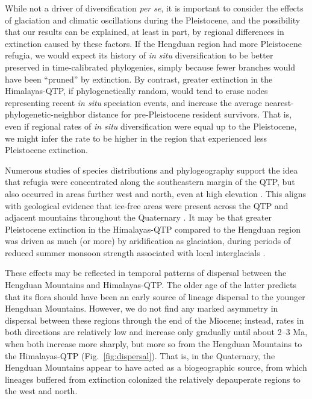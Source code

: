 
While not a driver of diversification \textit{per se}, it is important to consider the effects of glaciation and climatic oscillations during the Pleistocene, and the possibility that our results can be explained, at least in part, by regional differences in extinction caused by these factors. If the Hengduan region had more Pleistocene refugia, we would expect its history of \textit{in situ} diversification to be better preserved in time-calibrated phylogenies, simply because fewer branches would have been ``pruned'' by extinction. By contrast, greater extinction in the Himalayas-QTP, if phylogenetically random, would tend to erase nodes representing recent \textit{in situ} speciation events, and increase the average nearest-phylogenetic-neighbor distance for pre-Pleistocene resident survivors. That is, even if regional rates of \textit{in situ} diversification were equal up to the Pleistocene, we might infer the rate to be higher in the region that experienced less Pleistocene extinction.

Numerous studies of species distributions \citep[e.g.,][]{srinivasan2014,lopez2011} and phylogeography \citep[e.g.,][]{CunY2010,WangBS2011,lei2014,meng2015} support the idea that refugia were concentrated along the southeastern margin of the QTP, but also occurred in areas further west and north, even at high elevation \citep[e.g.,][]{wang2009,sun2010,opgenoorth2010}. This aligns with geological evidence that ice-free areas were present across the QTP and adjacent mountains throughout the Quaternary \citep[see][]{owen2014}. It may be that greater Pleistocene extinction in the Himalayas-QTP compared to the Hengduan region was driven as much (or more) by aridification as glaciation, during periods of reduced summer monsoon strength associated with local interglacials \citep{owen2008}.

These effects may be reflected in temporal patterns of dispersal between the Hengduan Mountains and Himalayas-QTP. The older age of the latter predicts that its flora should have been an early source of lineage dispersal to the younger Hengduan Mountains. However, we do not find any marked asymmetry in dispersal between these regions through the end of the Miocene; instead, rates in both directions are relatively low and increase only gradually until about 2--3 Ma, when both increase more sharply, but more so from the Hengduan Mountains to the Himalayas-QTP (Fig.~\ref{fig:dispersal}). That is, in the Quaternary, the Hengduan Mountains appear to have acted as a biogeographic source, from which lineages buffered from extinction colonized the relatively depauperate regions to the west and north. %

